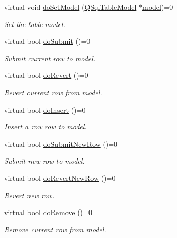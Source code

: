 \begin{DoxyCompactItemize}
\item 
virtual void \hyperlink{classmdt_abstract_sql_widget_aad8608a92f65790c99ca7897fbd48c30}{do\-Set\-Model} (\hyperlink{class_q_sql_table_model}{Q\-Sql\-Table\-Model} $\ast$\hyperlink{classmdt_abstract_sql_widget_a298d40a6540aeabbb7644e3c4fd9f3ea}{model})=0
\begin{DoxyCompactList}\small\item\em Set the table model. \end{DoxyCompactList}\item 
virtual bool \hyperlink{classmdt_abstract_sql_widget_a7a97e9c9f3b9c22650e4b55d095543ef}{do\-Submit} ()=0
\begin{DoxyCompactList}\small\item\em Submit current row to model. \end{DoxyCompactList}\item 
virtual bool \hyperlink{classmdt_abstract_sql_widget_a2c0cbbcd02be19767e68153ecbc2392d}{do\-Revert} ()=0
\begin{DoxyCompactList}\small\item\em Revert current row from model. \end{DoxyCompactList}\item 
virtual bool \hyperlink{classmdt_abstract_sql_widget_aa79059c092c6bcda569ced7c0621a817}{do\-Insert} ()=0
\begin{DoxyCompactList}\small\item\em Insert a row row to model. \end{DoxyCompactList}\item 
virtual bool \hyperlink{classmdt_abstract_sql_widget_ac546802e2910fc49c007eda5dbb3b3f7}{do\-Submit\-New\-Row} ()=0
\begin{DoxyCompactList}\small\item\em Submit new row to model. \end{DoxyCompactList}\item 
virtual bool \hyperlink{classmdt_abstract_sql_widget_a048efd5f89be7c6e74d6988b7e95fc07}{do\-Revert\-New\-Row} ()=0
\begin{DoxyCompactList}\small\item\em Revert new row. \end{DoxyCompactList}\item 
virtual bool \hyperlink{classmdt_abstract_sql_widget_a41c30652fa9775c7b3bc6cb51004d4d5}{do\-Remove} ()=0
\begin{DoxyCompactList}\small\item\em Remove current row from model. \end{DoxyCompactList}\item 

\end{DoxyCompactItemize}
